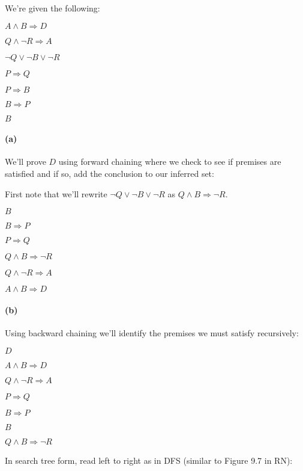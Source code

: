 \documentclass[11pt,a4paper]{article}
\begin{document}
We're given the following:

$A \wedge B \Rightarrow D$

$Q \wedge \neg R \Rightarrow A$

$\neg Q \vee \neg B \vee \neg R$

$P \Rightarrow Q$

$P \Rightarrow B$

$B \Rightarrow P$

$B$
\paragraph*{(a)}

We'll prove $D$ using forward chaining where we check to see if premises are satisfied and if so, add the conclusion to our inferred set:

First note that we'll rewrite $\neg Q \vee \neg B \vee \neg R$ as $Q \wedge B \Rightarrow \neg R$. 

$B$

$B \Rightarrow P$

$P \Rightarrow Q$

$Q \wedge B \Rightarrow \neg R$

$Q \wedge \neg R \Rightarrow A$

$A \wedge B \Rightarrow D$

\paragraph*{(b)}

Using backward chaining we'll identify the premises we must satisfy recursively:

$D$

$A \wedge B \Rightarrow D$

$Q \wedge \neg R \Rightarrow A$

$P \Rightarrow Q$

$B \Rightarrow P$

$B$

$Q \wedge B \Rightarrow \neg R$


In search tree form, read left to right as in DFS (similar to Figure 9.7 in RN):
\begin{center}
\end{center}
\end{document}
